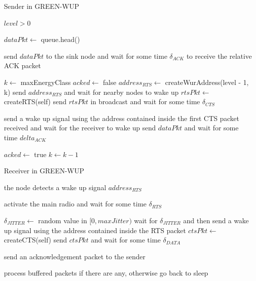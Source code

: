 \documentclass[binding=0.6cm,TFA]{sapthesis}
\begin{document}
\begin{algorithm}
    \caption{Sender in GREEN-WUP}
    \begin{algorithmic}
        \REQUIRE $level > 0$

            \STATE $dataPkt \leftarrow$ queue.head()

                \STATE send $dataPkt$ to the sink node and wait for some time $\delta_{ACK}$ to receive the relative ACK packet

            \ELSE
                \STATE $k \leftarrow$ maxEnergyClass
                \STATE $acked \leftarrow$ false
                    \STATE $address_{RTS} \leftarrow$ createWurAddress(level - 1, k)
                    \STATE send $address_{RTS}$ and wait for nearby nodes to wake up
                    \STATE $rtsPkt \leftarrow$ createRTS(self)
                    \STATE send $rtsPkt$ in broadcast and wait for some time $\delta_{CTS}$
                    
                        \STATE send a wake up signal using the address contained inside the first CTS packet received and wait for the receiver to wake up
                        \STATE send $dataPkt$ and wait for some time $delta_{ACK}$

                            \STATE $acked \leftarrow$ true
                        \ENDIF
                    \ENDIF
                    \STATE $k \leftarrow k-1$
                \ENDWHILE
            \ENDIF
        
        \ENDWHILE
    \end{algorithmic}
\end{algorithm}

\begin{algorithm}
    \caption{Receiver in GREEN-WUP}
    \begin{algorithmic}
        \REQUIRE the node detects a wake up signal $address_{RTS}$

            \STATE activate the main radio and wait for some time $\delta_{RTS}$

                \STATE $\delta_{JITTER} \leftarrow$ random value in $[0,maxJitter)$
                \STATE wait for $\delta_{JITTER}$ and then send a wake up signal using the address contained inside the RTS packet
                \STATE $ctsPkt \leftarrow$ createCTS(self)
                \STATE send $ctsPkt$ and wait for some time $\delta_{DATA}$

                    \STATE send an acknowledgement packet to the sender
                \ENDIF
            \ENDIF

            \STATE process buffered packets if there are any, otherwise go back to sleep
        
    \end{algorithmic}
\end{algorithm}
\end{document}
